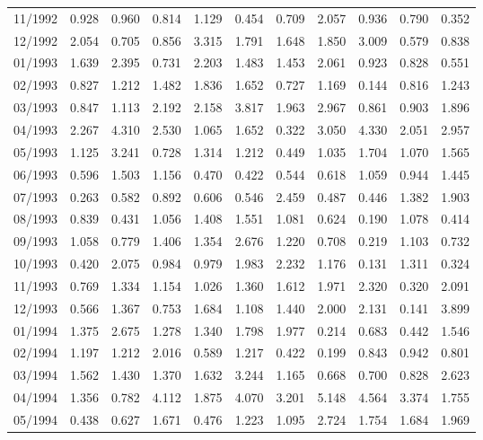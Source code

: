 \begin{tabular}{lrrrrrrrrrr}
11/1992 &  0.928 &  0.960 &  0.814 &  1.129 &  0.454 &  0.709 &  2.057 &  0.936 &  0.790 &  0.352 \\
12/1992 &  2.054 &  0.705 &  0.856 &  3.315 &  1.791 &  1.648 &  1.850 &  3.009 &  0.579 &  0.838 \\
01/1993 &  1.639 &  2.395 &  0.731 &  2.203 &  1.483 &  1.453 &  2.061 &  0.923 &  0.828 &  0.551 \\
02/1993 &  0.827 &  1.212 &  1.482 &  1.836 &  1.652 &  0.727 &  1.169 &  0.144 &  0.816 &  1.243 \\
03/1993 &  0.847 &  1.113 &  2.192 &  2.158 &  3.817 &  1.963 &  2.967 &  0.861 &  0.903 &  1.896 \\
04/1993 &  2.267 &  4.310 &  2.530 &  1.065 &  1.652 &  0.322 &  3.050 &  4.330 &  2.051 &  2.957 \\
05/1993 &  1.125 &  3.241 &  0.728 &  1.314 &  1.212 &  0.449 &  1.035 &  1.704 &  1.070 &  1.565 \\
06/1993 &  0.596 &  1.503 &  1.156 &  0.470 &  0.422 &  0.544 &  0.618 &  1.059 &  0.944 &  1.445 \\
07/1993 &  0.263 &  0.582 &  0.892 &  0.606 &  0.546 &  2.459 &  0.487 &  0.446 &  1.382 &  1.903 \\
08/1993 &  0.839 &  0.431 &  1.056 &  1.408 &  1.551 &  1.081 &  0.624 &  0.190 &  1.078 &  0.414 \\
09/1993 &  1.058 &  0.779 &  1.406 &  1.354 &  2.676 &  1.220 &  0.708 &  0.219 &  1.103 &  0.732 \\
10/1993 &  0.420 &  2.075 &  0.984 &  0.979 &  1.983 &  2.232 &  1.176 &  0.131 &  1.311 &  0.324 \\
11/1993 &  0.769 &  1.334 &  1.154 &  1.026 &  1.360 &  1.612 &  1.971 &  2.320 &  0.320 &  2.091 \\
12/1993 &  0.566 &  1.367 &  0.753 &  1.684 &  1.108 &  1.440 &  2.000 &  2.131 &  0.141 &  3.899 \\
01/1994 &  1.375 &  2.675 &  1.278 &  1.340 &  1.798 &  1.977 &  0.214 &  0.683 &  0.442 &  1.546 \\
02/1994 &  1.197 &  1.212 &  2.016 &  0.589 &  1.217 &  0.422 &  0.199 &  0.843 &  0.942 &  0.801 \\
03/1994 &  1.562 &  1.430 &  1.370 &  1.632 &  3.244 &  1.165 &  0.668 &  0.700 &  0.828 &  2.623 \\
04/1994 &  1.356 &  0.782 &  4.112 &  1.875 &  4.070 &  3.201 &  5.148 &  4.564 &  3.374 &  1.755 \\
05/1994 &  0.438 &  0.627 &  1.671 &  0.476 &  1.223 &  1.095 &  2.724 &  1.754 &  1.684 &  1.969 \\

\end{tabular}
